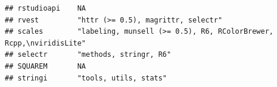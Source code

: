 \documentclass[]{article}
\begin{document}
\begin{verbatim}
## rstudioapi    NA                                                                                                                                                                                                                                                                                                                                                                                                                                                                                    
## rvest         "httr (>= 0.5), magrittr, selectr"                                                                                                                                                                                                                                                                                                                                                                                                                                                    
## scales        "labeling, munsell (>= 0.5), R6, RColorBrewer, Rcpp,\nviridisLite"                                                                                                                                                                                                                                                                                                                                                                                                                    
## selectr       "methods, stringr, R6"                                                                                                                                                                                                                                                                                                                                                                                                                                                                
## SQUAREM       NA                                                                                                                                                                                                                                                                                                                                                                                                                                                                                    
## stringi       "tools, utils, stats"                                                                                                                                                                                                                                                                                                                                                                                                                                                                 

\end{verbatim}
\end{document}
